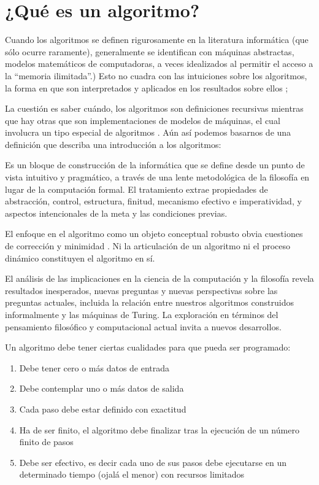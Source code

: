     \section{¿Qué es un algoritmo?}

Cuando los algoritmos se definen rigurosamente en la literatura informática (que sólo ocurre raramente), generalmente se identifican con máquinas abstractas, modelos matemáticos de computadoras, a veces idealizados al permitir el acceso a la ``memoria ilimitada''.) Esto no cuadra con las intuiciones sobre los algoritmos, la forma en que son interpretados y aplicados en los resultados sobre ellos \autocite{moschovakis2001algorithm}; 

La cuestión es saber cuándo, los algoritmos son definiciones recursivas mientras que hay otras que son implementaciones de modelos de máquinas, el cual involucra un tipo especial de algoritmos \autocite{gurevich2012algorithm}. Aún así podemos basarnos de una definición que describa una introducción a los algoritmos:

    \begin{definition}[Algoritmo]
        Es un bloque de construcción de la informática que se define desde un punto de vista intuitivo y pragmático, a través de una lente metodológica de la filosofía en lugar de la computación formal. El tratamiento extrae propiedades de abstracción, control, estructura, finitud, mecanismo efectivo e imperatividad, y aspectos intencionales de la meta y las condiciones previas. 
    \end{definition}

El enfoque en el algoritmo como un objeto conceptual robusto obvia cuestiones de corrección y minimidad \autocite{hill2016algorithm}. Ni la articulación de un algoritmo ni el proceso dinámico constituyen el algoritmo en sí. 

El análisis de las implicaciones en la ciencia de la computación y la filosofía revela resultados inesperados, nuevas preguntas y nuevas perspectivas sobre las preguntas actuales, incluida la relación entre nuestros algoritmos construidos informalmente y las máquinas de Turing. La exploración en términos del pensamiento filosófico y computacional actual invita a nuevos desarrollos.

Un algoritmo debe tener ciertas cualidades para que pueda ser programado:

\begin{enumerate}
    \item Debe tener cero o más datos de entrada
    \item Debe contemplar uno o más datos de salida
    \item Cada paso debe estar definido con exactitud
    \item Ha de ser finito, el algoritmo debe finalizar tras la ejecución de un número finito de pasos
    \item Debe ser efectivo, es decir cada uno de sus pasos debe ejecutarse en un determinado tiempo (ojalá el menor) con recursos limitados
\end{enumerate}

